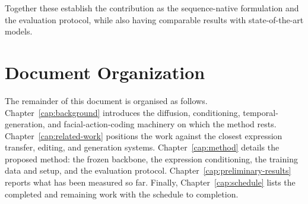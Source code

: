 \noindent Together these establish the contribution as the sequence-native formulation and the evaluation protocol, while also having comparable results with state-of-the-art models.

\section{Document Organization}\label{sec:organization}

The remainder of this document is organised as follows. Chapter~\ref{cap:background} introduces
the diffusion, conditioning, temporal-generation, and facial-action-coding machinery on which the
method rests. Chapter~\ref{cap:related-work} positions the work against the closest expression
transfer, editing, and generation systems. Chapter~\ref{cap:method} details the proposed method:
the frozen backbone, the expression conditioning, the training data and setup, and the evaluation
protocol. Chapter~\ref{cap:preliminary-results} reports what has been measured so far. Finally, Chapter~\ref{cap:schedule} lists the completed and remaining
work with the schedule to completion.
